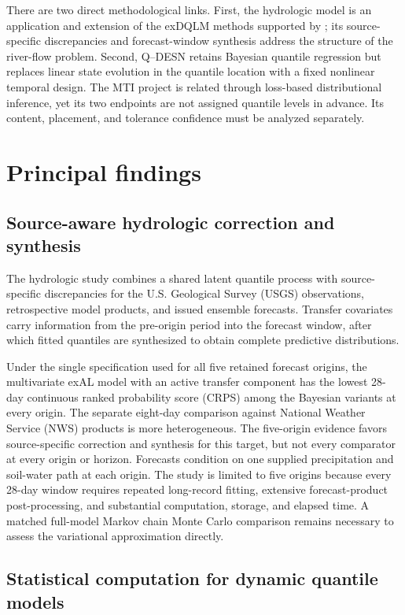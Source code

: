 There are two direct methodological links. First, the hydrologic model is an
application and extension of the exDQLM methods supported by ; its
source-specific discrepancies and forecast-window synthesis address the
structure of the river-flow problem. Second, Q--DESN retains Bayesian quantile
regression but replaces linear state evolution in the quantile location with a
fixed nonlinear temporal design. The MTI project is related through
loss-based distributional inference, yet its two endpoints are not assigned
quantile levels in advance. Its content, placement, and tolerance confidence
must be analyzed separately.

\section{Principal findings}
\label{sec:synthesis-findings}

\subsection{Source-aware hydrologic correction and synthesis}

The hydrologic study combines a shared latent quantile process with
source-specific discrepancies for the U.S. Geological Survey (USGS)
observations, retrospective model products, and issued ensemble forecasts.
Transfer covariates carry information
from the pre-origin period into the forecast window, after which fitted
quantiles are synthesized to obtain complete predictive distributions.

Under the single specification used for all five retained forecast origins,
the multivariate exAL model with an active transfer component has the lowest
28-day continuous ranked probability score (CRPS) among the Bayesian variants
at every origin. The separate eight-day comparison against National Weather
Service (NWS) products is more heterogeneous. The five-origin evidence favors
source-specific correction and synthesis for this target, but not every
comparator at every origin or horizon. Forecasts condition on one supplied
precipitation and soil-water path at each origin. The study is limited to five
origins because every 28-day window requires repeated long-record fitting,
extensive forecast-product post-processing, and substantial computation,
storage, and elapsed time. A matched full-model Markov chain Monte Carlo
comparison remains necessary to assess the variational approximation directly.

\subsection{Statistical computation for dynamic quantile models}

